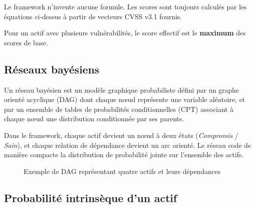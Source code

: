 \documentclass[12pt,a4paper]{article}
\newcommand{\forcereset}[1]{}
\begin{document}
Le framework n'invente aucune formule. Les scores sont toujours calculés par les équations ci-dessus à partir de vecteurs CVSS v3.1 fournis.

Pour un actif avec plusieurs vulnérabilités, le score effectif est le \textbf{maximum} des scores de base.

\subsection{Réseaux bayésiens}
\forcereset{5}

\begin{defbox}
Un réseau bayésien est un modèle graphique probabiliste défini par un graphe orienté acyclique (DAG) dont chaque nœud représente une variable aléatoire, et par un ensemble de tables de probabilités conditionnelles (CPT) associant à chaque nœud une distribution conditionnée par ses parents.
\end{defbox}

Dans le framework, chaque actif devient un nœud à deux états (\emph{Compromis} / \emph{Sain}), et chaque relation de dépendance devient un arc orienté. Le réseau code de manière compacte la distribution de probabilité jointe sur l'ensemble des actifs.

\begin{figure}[H]
\centering
{}
\caption{Exemple de DAG représentant quatre actifs et leurs dépendances}
\label{fig:dag}
\end{figure}

\subsection{Probabilité intrinsèque d'un actif}
\forcereset{5}
\end{document}
